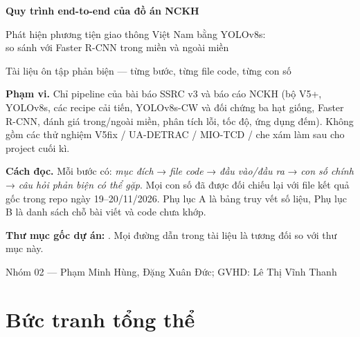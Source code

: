\documentclass[11pt,a4paper]{article}
\newcommand{\f}[1]{\path{#1}}           %
\begin{document}
\sloppy\setlength{\emergencystretch}{3em}

\begin{titlepage}
\centering
\vspace*{2.5cm}
{\Huge\bfseries\color{c1} Quy trình end-to-end của đồ án NCKH\par}
\vspace{0.6cm}
{\Large Phát hiện phương tiện giao thông Việt Nam bằng YOLOv8s:\\ so sánh với Faster R-CNN trong miền và ngoài miền\par}
\vspace{1cm}
{\large Tài liệu ôn tập phản biện — từng bước, từng file code, từng con số\par}
\vspace{1.5cm}
\begin{tomtat}
\textbf{Phạm vi.} Chỉ pipeline của bài báo SSRC v3 và báo cáo NCKH (bộ V5+, YOLOv8s, các recipe cải tiến, YOLOv8s-CW và đối chứng ba hạt giống, Faster R-CNN, đánh giá trong/ngoài miền, phân tích lỗi, tốc độ, ứng dụng đếm). Không gồm các thử nghiệm V5fix / UA-DETRAC / MIO-TCD / che xám làm sau cho project cuối kì.

\textbf{Cách đọc.} Mỗi bước có: \emph{mục đích} → \emph{file code} → \emph{đầu vào/đầu ra} → \emph{con số chính} → \emph{câu hỏi phản biện có thể gặp}. Mọi con số đã được đối chiếu lại với file kết quả gốc trong repo ngày 19–20/11/2026. Phụ lục A là bảng truy vết số liệu, Phụ lục B là danh sách chỗ bài viết và code chưa khớp.

\textbf{Thư mục gốc dự án:} \f{/home/xuand/vn_traffic_ai}. Mọi đường dẫn trong tài liệu là tương đối so với thư mục này.
\end{tomtat}
\vfill
{\small Nhóm 02 — Phạm Minh Hùng, Đặng Xuân Đức; GVHD: Lê Thị Vĩnh Thanh\par}
\end{titlepage}

\tableofcontents
\newpage

\section{Bức tranh tổng thể}
\end{document}
